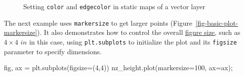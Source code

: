 \documentclass[
  letterpaper,
]{krantz}
\newenvironment{Shaded}{\begin{snugshade}}{\end{snugshade}}
\newcommand{\DecValTok}[1]{\textcolor[rgb]{0.68,0.00,0.00}{#1}}
\newcommand{\NormalTok}[1]{\textcolor[rgb]{0.00,0.23,0.31}{#1}}
\newcommand{\OperatorTok}[1]{\textcolor[rgb]{0.37,0.37,0.37}{#1}}
\begin{document}
\begin{figure}

\begin{minipage}{0.33\linewidth}



\end{minipage}%
%
\begin{minipage}{0.33\linewidth}



\end{minipage}%
%
\begin{minipage}{0.33\linewidth}



\end{minipage}%

\caption{\label{fig-basic-plot}Setting \texttt{color} and
\texttt{edgecolor} in static maps of a vector layer}

\end{figure}%

The next example uses \texttt{markersize} to get larger points
(Figure~\ref{fig-basic-plot-markersize}). It also demonstrates how to
control the overall
\href{https://matplotlib.org/stable/gallery/subplots_axes_and_figures/figure_size_units.html}{figure
size}, such as \(4 \times 4\) \(in\) in this case, using
\texttt{plt.subplots} to initialize the plot and its \texttt{figsize}
parameter to specify dimensions.

\begin{Shaded}
\begin{Highlighting}[]
\NormalTok{fig, ax }\OperatorTok{=}\NormalTok{ plt.subplots(figsize}\OperatorTok{=}\NormalTok{(}\DecValTok{4}\NormalTok{,}\DecValTok{4}\NormalTok{))}
\NormalTok{nz\_height.plot(markersize}\OperatorTok{=}\DecValTok{100}\NormalTok{, ax}\OperatorTok{=}\NormalTok{ax)}\OperatorTok{;}
\end{Highlighting}
\end{Shaded}
\end{document}
